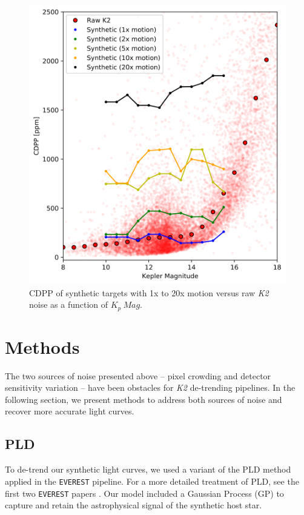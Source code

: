 \documentclass[12pt,preprint]{aastex}
\begin{document}
\begin{figure}[h]
	\centering
	\includegraphics[width=1.0\linewidth]{rawmotion.png}
	\caption{CDPP of synthetic targets with 1x to 20x motion versus raw \textit{K2} noise as a function of $K_p\ Mag$.}
	\label{fig:rawmotion}
\end{figure}

\section{Methods}

The two sources of noise presented above -- pixel crowding and detector sensitivity variation -- have been obstacles for \textit{K2} de-trending pipelines. In the following section, we present methods to address both sources of noise and recover more accurate light curves.

\subsection{PLD}

To de-trend our synthetic light curves, we used a variant of the PLD method applied in the \texttt{EVEREST} pipeline. For a more detailed treatment of PLD, see the first two \texttt{EVEREST} papers \citep{2016AJ....152..100L,2017arXiv170205488L}. Our model included a Gaussian Process (GP) to capture and retain the astrophysical signal of the synthetic host star.
\end{document}
